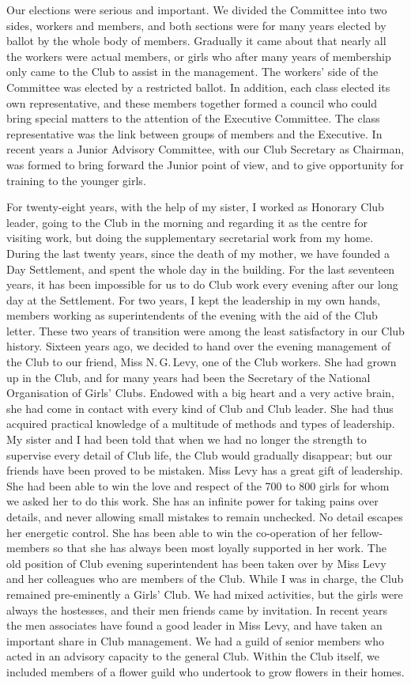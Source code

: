 Our elections were serious and important. We divided
the Committee into two sides, workers and members, and
both sections were for many years elected by ballot by
the whole body of members. Gradually it came about
that nearly all the workers were actual members, or girls
who after many years of membership only came to the
Club to assist in the management. The workers’ side of
the Committee was elected by a restricted ballot. In
addition, each class elected its own representative, and
these members together formed a council who could
bring special matters to the attention of the Executive
Committee. The class representative was the link
between groups of members and the Executive. In recent
years a Junior Advisory Committee, with our Club Secretary
as Chairman, was formed to bring forward the
Junior point of view, and to give opportunity for training
to the younger girls.

For twenty-eight years, with the help of my sister, I
worked as Honorary Club leader, going to the Club in the
morning and regarding it as the centre for visiting work,
but doing the supplementary secretarial work from my
home. During the last twenty years, since the death of
my mother, we have founded a Day Settlement, and spent
the whole day in the building. For the last seventeen
years, it has been impossible for us to do Club work every
evening after our long day at the Settlement. For two
years, I kept the leadership in my own hands, members
working as superintendents of the evening with the aid of
the Club letter. These two years of transition were among
the least satisfactory in our Club history. Sixteen years
ago, we decided to hand over the evening management
of the Club to our friend, Miss N.\,G.\,Levy, one of the
Club workers. She had grown up in the Club, and for
many years had been the Secretary of the National
Organisation of Girls’ Clubs. Endowed with a big heart
and a very active brain, she had come in contact with
every kind of Club and Club leader. She had thus
acquired practical knowledge of a multitude of methods
and types of leadership. My sister and I had been told
that when we had no longer the strength to supervise
every detail of Club life, the Club would gradually disappear;
but our friends have been proved to be mistaken.
Miss Levy has a great gift of leadership. She
had been able to win the love and respect of the 700 to
800 girls for whom we asked her to do this work. She
has an infinite power for taking pains over details, and
never allowing small mistakes to remain unchecked. No
detail escapes her energetic control. She has been able
to win the co-operation of her fellow-members so that
she has always been most loyally supported in her work.
The old position of Club evening superintendent has
been taken over by Miss Levy and her colleagues who
are members of the Club. While I was in charge, the
Club remained pre-eminently a Girls’ Club. We had
mixed activities, but the girls were always the hostesses,
and their men friends came by invitation. In recent
years the men associates have found a good leader in
Miss Levy, and have taken an important share in Club
management. We had a guild of senior members who
acted in an advisory capacity to the general Club. Within
the Club itself, we included members of a flower guild
who undertook to grow flowers in their homes.

